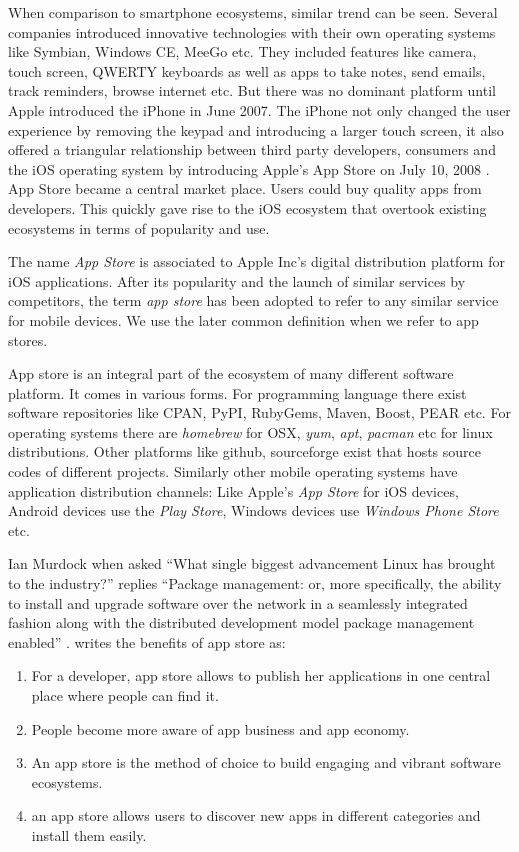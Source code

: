 When comparison to smartphone ecosystems, similar trend can be seen. Several companies introduced innovative technologies with their own operating systems like Symbian, Windows CE, MeeGo etc. They included features like camera, touch screen, QWERTY keyboards as well as apps to take notes, send emails, track reminders, browse internet etc. But there was no dominant platform until Apple introduced the iPhone in June 2007. The iPhone not only changed the user experience by removing the keypad and introducing a larger touch screen, it also offered a triangular relationship between third party developers, consumers and the iOS operating system by introducing Apple's App Store on July 10, 2008 \cite{wiki:AppStore_iOS}. App Store became a central market place. Users could buy quality apps from developers. This quickly gave rise to the iOS ecosystem that overtook existing ecosystems in terms of popularity and use.

The name \emph{App Store} is associated to Apple Inc's digital distribution platform for iOS applications. After its popularity and the launch of similar services by competitors, the term \emph{app store} has been adopted to refer to any similar service for mobile devices. We use the later common definition when we refer to app stores. 

App store is an integral part of the ecosystem of many different software platform. It comes in various forms. For programming language there exist software repositories like CPAN, PyPI, RubyGems, Maven, Boost, PEAR etc. For operating systems there are \textit{homebrew} for OSX, \textit{yum}, \textit{apt}, \textit{pacman} etc for linux distributions. Other platforms like github, sourceforge exist that hosts source codes of different projects. Similarly other mobile operating systems have application distribution channels: Like Apple's \emph{App Store} for iOS devices, Android devices use the \textit{Play Store}, Windows devices use \emph{Windows Phone Store} etc.

Ian Murdock when asked ``What single biggest advancement Linux has brought to the industry?'' replies ``Package management: or, more specifically, the ability to install and upgrade software over the network in a seamlessly integrated fashion along with the distributed development model package management enabled'' \cite{murdock_how_package_management}. \cite{Jansen} writes the benefits of app store as:

\begin{enumerate}
  \item For a developer, app store allows to publish her applications in one central place where people can find it.
  \item People become more aware of app business and app economy.
  \item An app store is the method of choice to build engaging and vibrant software ecosystems.
  \item an app store allows users to discover new apps in different categories and install them easily.
\end{enumerate}

